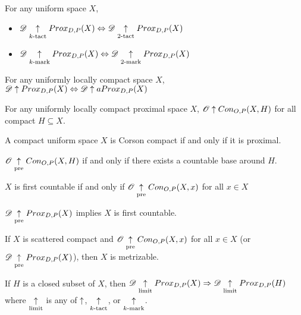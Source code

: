 \begin{prop} For any uniform space $X$,
  \begin{itemize}
    \item
      $\mathscr{D}\underset{k\text{-tact}}{\uparrow}Prox_{D,P}(X) \Leftrightarrow \mathscr{D}\underset{2\text{-tact}}{\uparrow}Prox_{D,P}(X)$
    \item
      $\mathscr{D}\underset{k\text{-mark}}{\uparrow}Prox_{D,P}(X) \Leftrightarrow \mathscr{D}\underset{2\text{-mark}}{\uparrow}Prox_{D,P}(X)$
  \end{itemize}
\end{prop}

\begin{thm}
  For any uniformly locally compact space $X$,
      $\mathscr{D}\uparrow Prox_{D,P}(X) \Leftrightarrow \mathscr{D}\uparrow aProx_{D,P}(X)$
\end{thm}

\begin{thm}
  For any uniformly locally compact proximal space $X$, $\mathscr{O}\uparrow Con_{O,P}(X,H)$ for all compact $H\subseteq X$.
\end{thm}

\begin{cor}
  A compact uniform space $X$ is Corson compact if and only if it is proximal.
\end{cor}

\begin{thm}
  $\mathscr{O} \underset{\text{pre}}{\uparrow} Con_{O,P}(X,H)$ if and only if there exists a countable base
  around $H$.
\end{thm}


\begin{cor}
  $X$ is first countable if and only if $\mathscr{O} \underset{\text{pre}}{\uparrow} Con_{O,P}(X,x)$ for
  all $x\in X$
\end{cor}

\begin{cor}
  $\mathscr{D} \underset{\text{pre}}{\uparrow} Prox_{D,P}(X)$ implies $X$ is first countable.
\end{cor}

\begin{cor}
  If $X$ is scattered compact and $\mathscr{O} \underset{\text{pre}}{\uparrow}Con_{O,P}(X,x)$ for all
  $x\in X$ (or $\mathscr{D} \underset{\text{pre}}{\uparrow}Prox_{D,P}(X)$), then $X$ is metrizable.
\end{cor}


\begin{thm}
  If $H$ is a closed subset of $X$, then
    $
      \mathscr{D} \underset{\text{limit}}{\uparrow} Prox_{D,P}(X)
        \Rightarrow
      \mathscr{D} \underset{\text{limit}}{\uparrow} Prox_{D,P}(H)
    $
  where $\underset{\text{limit}}{\uparrow}$ is any of $\uparrow$, $\underset{k\text{-tact}}{\uparrow}$, or $\underset{k\text{-mark}}{\uparrow}$.
\end{thm}


